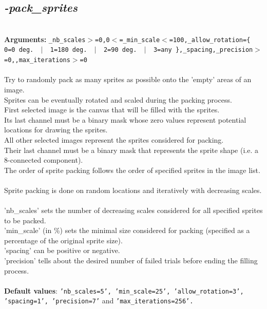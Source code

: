 \documentclass[a4paper,11pt,twoside]{book}
\begin{document}
\subsection{\emph{-pack\_sprites} }\vspace*{-0.5em}
~\\\textbf{Arguments: } 
{\small \texttt{\_nb\_scales$>$=0,0$<$=\_min\_scale$<$=100,\_allow\_rotation=\{ 0=0 deg. ~$|$~ 1=180 deg. ~$|$~ 2=90 deg. ~$|$~ 3=any \},\_spacing,\_precision$>$=0,,max\_iterations$>$=0}}\\~\\
Try to randomly pack as many sprites as possible onto the 'empty' areas of an image.
~\\Sprites can be eventually rotated and scaled during the packing process.
~\\First selected image is the canvas that will be filled with the sprites.
~\\Its last channel must be a binary mask whose zero values represent potential locations for drawing the sprites.
~\\All other selected images represent the sprites considered for packing.
~\\Their last channel must be a binary mask that represents the sprite shape (i.e. a 8-connected component).
~\\The order of sprite packing follows the order of specified sprites in the image list.
~\\Sprite packing is done on random locations and iteratively with decreasing scales.
~\\'nb\_scales' sets the number of decreasing scales considered for all specified sprites to be packed.
~\\'min\_scale' (in \%) sets the minimal size considered for packing (specified as a percentage of the original sprite size).
~\\'spacing' can be positive or negative.
~\\'precision' tells about the desired number of failed trials before ending the filling process.
~\\~\\\textbf{Default values}: {\small \texttt{'nb\_scales=5', 'min\_scale=25', 'allow\_rotation=3', 'spacing=1', 'precision=7'} and \texttt{'max\_iterations=256'.}}
\end{document}
